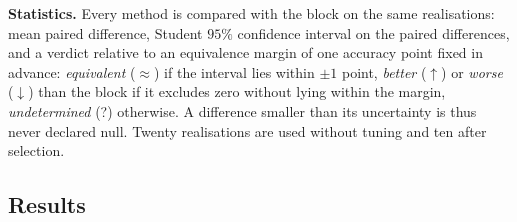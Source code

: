 \documentclass[11pt,a4paper]{article}
\theoremstyle{plain}
\theoremstyle{definition}
\theoremstyle{remark}
\begin{document}
\textbf{Statistics.} Every method is compared with the block on the same
realisations: mean paired difference, Student $95\%$ confidence interval on
the paired differences, and a verdict relative to an equivalence margin of
one accuracy point fixed in advance: \emph{equivalent} ($\approx$) if the
interval lies within $\pm1$ point, \emph{better} ($\uparrow$) or
\emph{worse} ($\downarrow$) than the block if it excludes zero without
lying within the margin, \emph{undetermined} (?) otherwise. A difference
smaller than its uncertainty is thus never declared null. Twenty
realisations are used without tuning and ten after selection.

\subsection{Results}
\begin{table}[h]
\centering\small\renewcommand{\arraystretch}{1.12}
\caption{Central benchmark \emph{without tuning} (default recipes). Block accuracy in \% (mean $\pm$ standard deviation over 20 realisations), then paired difference to the block in points, [95\% interval] and verdict ($\approx$ equivalent within one point, $\uparrow$ better than the block, $\downarrow$ worse, ? undetermined). $n$: training samples per class.}
\label{tab:central-def}
\end{table}
\end{document}
